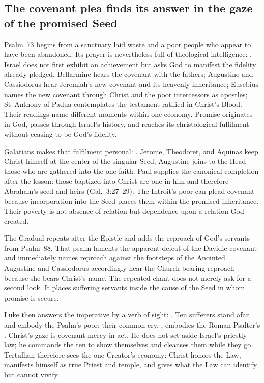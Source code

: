\subsection*{The covenant plea finds its answer in the gaze of the promised Seed\enspace
  }

Psalm~73 begins from a sanctuary laid waste and a poor people who appear to
have been abandoned. Its prayer is nevertheless full of theological
intelligence: . Israel does not
first exhibit an achievement but asks God to manifest the fidelity already
pledged. Bellarmine hears the covenant with the fathers; Augustine and
Cassiodorus hear Jeremiah's new covenant and its heavenly inheritance;
Eusebius names the new covenant through Christ and the poor intercessors as
apostles; St~Anthony of Padua contemplates the testament ratified in
Christ's Blood. Their readings name different moments within one economy.
Promise originates in God, passes through Israel's history, and reaches its
christological fulfilment without ceasing to be God's fidelity.

Galatians makes that fulfilment personal: . Jerome, Theodoret, and Aquinas keep Christ himself at the center of
the singular Seed; Augustine joins to the Head those who are gathered into the
one faith. Paul supplies the canonical completion after the lesson: those
baptized into Christ are one in him and therefore Abraham's seed and heirs
(Gal.~3:27--29). The Introit's poor can plead covenant because incorporation
into the Seed places them within the promised inheritance. Their poverty is
not absence of relation but dependence upon a relation God created.

The Gradual repeats  after the Epistle and adds the reproach of
God's servants from Psalm~88. That psalm laments the apparent defeat of the
Davidic covenant and immediately names reproach against the footsteps of the
Anointed. Augustine and Cassiodorus accordingly hear the Church bearing
reproach because she bears Christ's name. The repeated chant does not merely
ask for a second look. It places suffering servants inside the cause of the
Seed in whom promise is secure.

Luke then answers the imperative by a verb of sight: .
Ten sufferers stand afar and embody the Psalm's poor; their common cry,
, embodies the Roman Psalter's
. Christ's gaze is covenant mercy in act. He does
not set aside Israel's priestly law; he commands the ten to show themselves and
cleanses them while they go. Tertullian therefore sees the one Creator's
economy: Christ honors the Law, manifests himself as true Priest and temple,
and gives what the Law can identify but cannot vivify.


